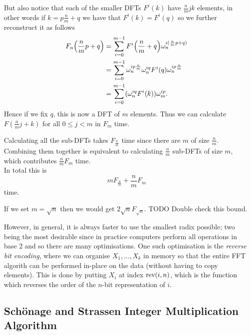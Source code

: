 But also notice that each of the smaller DFTs $F^i(k)$ have $\frac{n}{m}jk$ elements, in other words if $k = p\frac{n}{m} + q$ we have that $F^i(k) = F^i(q)$ so we further reconstruct it as follows
\begin{align*}
    F_n\bb{\frac{n}{m}p + q} &= \sum^{m-1}_{i=0} F^i\bb{\frac{n}{m} + q}\omega^{i(\frac{n}{m}p + q)}_n\\
    &= \sum^{m-1}_{i=0} \omega^{ip\frac{n}{m}}_n \omega_n^{iq} F^i(q)\omega^{ip\frac{n}{m}}_n\\
    &= \sum^{m-1}_{i=0} (\omega^{iq}_n F^i(k))\omega^{ip}_m.
\end{align*}
Hence if we fix $q$, this is now a DFT of $m$ elements. Thus we can calculate $F(\frac{n}{m}j + k)$ for all $0 \leq j < m$ in $F_m$ time.

Calculating all the sub-DFTs takes $F_{\frac{n}{m}}$ time since there are $m$ of size $\frac{n}{m}$. Combining them together is equivalent to calculating $\frac{n}{m}$ sub-DFTs of size $m$, which contributes $\frac{n}{m}F_{m}$ time.\\
In total this is
\[
    mF_{\frac{n}{m}} + \frac{n}{m}F_m
\]
time.

If we set $m = \sqrt{n}$ then we would get $2\sqrt{n}F_{\sqrt{n}}$. TODO Double check this bound.

However, in general, it is always faster to use the smallest radix possible; two being the most desirable since in practice computers perform all operations in base 2 and so there are many optimisations. One such optimisation is the \emph{reverse bit encoding}, where we can organise $X_1, \ldots, X_k$ in memory so that the entire FFT algorith can be performed in-place on the data (without having to copy elements). This is done by putting $X_i$ at index $\textrm{rev}(i, n)$, which is the function which reverses the order of the $n$-bit representation of $i$.

\subsection{Sch\"{o}nage and Strassen Integer Multiplication Algorithm}
\label{subsec:schon-strass}

